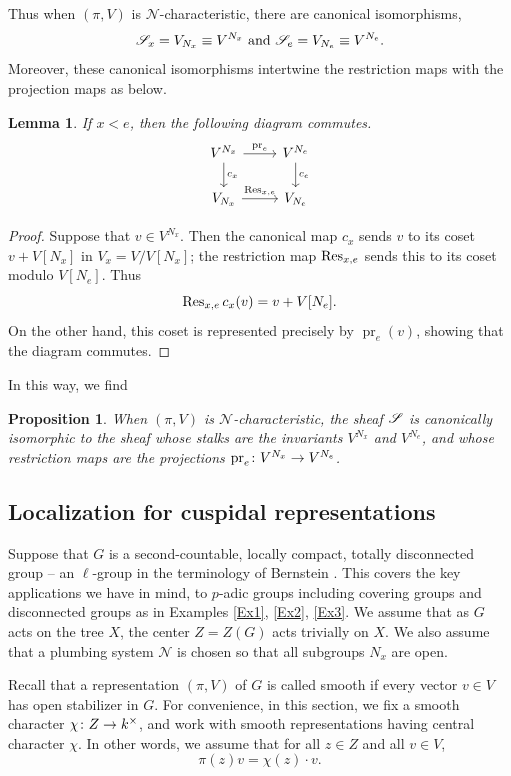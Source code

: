 \documentclass[letter]{amsart}
\newtheorem{lemma}[thm]{Lemma}
\newtheorem{proposition}[thm]{Proposition}
\theoremstyle{definition}
\theoremstyle{remark}
\numberwithin{thm}{section}
\numberwithin{equation}{section}
\renewcommand{\NN}{{\mathcal N}}
\DeclareMathOperator{\pr}{pr}
\begin{document}
Thus when $(\pi, V)$ is $\NN$-characteristic, there are canonical isomorphisms,
$${\mathscr{S}}_x = V_{N_x} \equiv V^{N_x} \text{ and } {\mathscr{S}}_e = V_{N_e} \equiv V^{N_e}.$$
Moreover, these canonical isomorphisms intertwine the restriction maps with the projection maps as below.
\begin{lemma}
If $x < e$, then the following diagram commutes.
$$
\begin{tikzcd}
V^{N_x} \arrow[r, "\pr_e"] \arrow[d, "c_x"] & V^{N_e} \arrow[d, "c_e"] \\
V_{N_x} \arrow[r, "\Res_{x,e}"]  & V_{N_e}
\end{tikzcd}
$$
\end{lemma}
\begin{proof}
Suppose that $v \in V^{N_x}$.  Then the canonical map $c_x$ sends $v$ to its coset $v + V[N_x]$ in $V_x = V / V[N_x]$; the restriction map $\operatorname{Res}_{x,e}$ sends this to its coset modulo $V[N_e]$.  Thus 
$$\operatorname{Res}_{x,e} c_x(v) = v + V[N_e].$$
On the other hand, this coset is represented precisely by $\pr_e(v)$, showing that the diagram commutes.
\end{proof}

In this way, we find
\begin{proposition}
When $(\pi, V)$ is $\NN$-characteristic, the sheaf ${\mathscr{S}}$ is canonically isomorphic to the sheaf whose stalks are the invariants $V^{N_x}$ and $V^{N_e}$, and whose restriction maps are the projections $\pr_e \From V^{N_x} \To V^{N_e}$.
\end{proposition} 

\subsection{Localization for cuspidal representations}

Suppose that $G$ is a second-countable, locally compact, totally disconnected group -- an $\ell$-group in the terminology of Bernstein \cite{Bernstein}.  This covers the key applications we have in mind, to $p$-adic groups including covering groups and disconnected groups as in Examples \ref{Ex1}, \ref{Ex2}, \ref{Ex3}.  
We assume that as $G$ acts on the tree $X$, the center $Z = Z(G)$ acts trivially on $X$.  We also assume that a plumbing system $\NN$ is chosen so that all subgroups $N_x$ are open.

Recall that a representation $(\pi, V)$ of $G$ is called smooth if every vector $v \in V$ has open stabilizer in $G$.  For convenience, in this section, we fix a smooth character $\chi \colon Z \rightarrow k^\times$, and work with smooth representations having central character $\chi$.  In other words, we assume that for all $z \in Z$ and all $v \in V$,
$$\pi(z) v = \chi(z) \cdot v.$$
\end{document}
